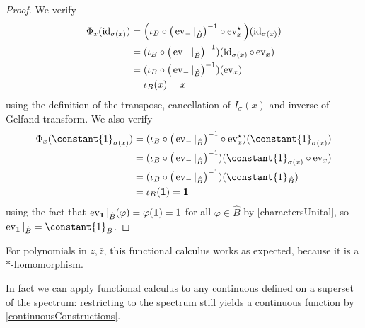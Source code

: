 \begin{proof}
We verify
\begin{align*}
\Phi_x(\operatorname{id}_{\sigma(x)}) &= \Big(\iota_B\circ\big(\operatorname{ev}_{-}|_{\hat{B}}\big)^{-1}\circ\operatorname{ev}_x^\star\Big)(\operatorname{id}_{\sigma(x)}) \\
&= (\iota_B\circ\big(\operatorname{ev}_{-}|_{\hat{B}}\big)^{-1})(\operatorname{id}_{\sigma(x)}\circ\operatorname{ev}_x) \\
&= (\iota_B\circ\big(\operatorname{ev}_{-}|_{\hat{B}}\big)^{-1})(\operatorname{ev}_x) \\
&= \iota_B(x) = x
\end{align*}
using the definition of the transpose, cancellation of $I_{\sigma}(x)$ and inverse of Gelfand transform. We also verify
\begin{align*}
\Phi_x(\constant{1}_{\sigma(x)}) &= (\iota_B\circ\big(\evalMap_{-}|_{\hat{B}}\big)^{-1}\circ\evalMap_x^\star)(\constant{1}_{\sigma(x)}) \\
&= (\iota_B\circ\big(\evalMap_{-}|_{\hat{B}}\big)^{-1})(\constant{1}_{\sigma(x)}\circ\evalMap_x) \\
&= (\iota_B\circ\big(\evalMap_{-}|_{\hat{B}}\big)^{-1})(\constant{1}_{\hat{B}}) \\
&= \iota_B(\vec{1}) = \vec{1}
\end{align*}
using the fact that $\operatorname{ev}_{\boldsymbol{\mathrm{1}}}|_{\hat{B}}(\varphi) = \varphi(\boldsymbol{\mathrm{1}}) = 1$ for all $\varphi\in \hat{B}$ by \ref{charactersUnital}, so $\evalMap_{\vec{1}}|_{\hat{B}} = \constant{1}_{\hat{B}}$.
\end{proof}
For polynomials in $z,\overline{z}$, this functional calculus works as expected, because it is a $*$-homomorphism.

In fact we can apply functional calculus to any continuous defined on a superset of the spectrum: restricting to the spectrum still yields a continuous function by \ref{continuousConstructions}.

